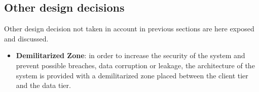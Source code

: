 \subsection{Other design decisions}

\label{sec:other-design-decisions}

Other design decision not taken in account in previous sections are here exposed and discussed.

\begin{itemize}
	\item \textbf{Demilitarized Zone}: in order to increase the security of the system and prevent possible breaches, data corruption or leakage, the architecture of the system is provided with a demilitarized zone placed between the client tier and the data tier.
\end{itemize}

